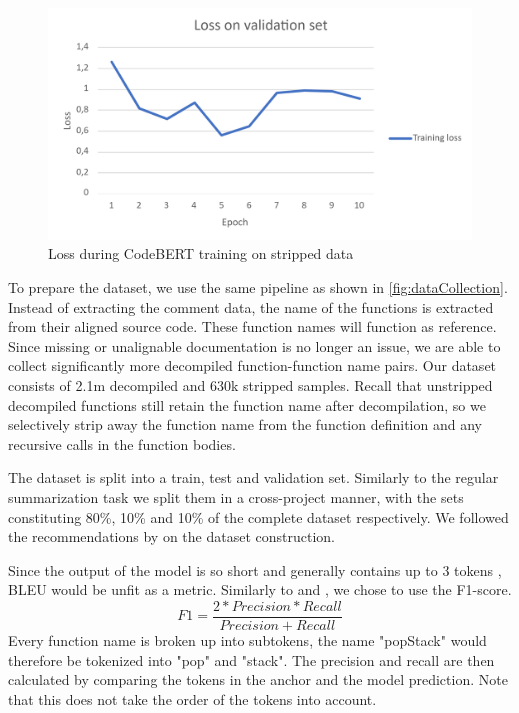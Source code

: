 \label{fig:ExtremeLoss}
\begin{figure}[h]
  \centering
  \includegraphics[width=\linewidth]{img/ExtremeLoss.png}
  \caption{Loss during CodeBERT training on stripped data}
\end{figure}

To prepare the dataset, we use the same pipeline as shown in \ref{fig:dataCollection}. Instead of extracting the comment data, the name of the functions is extracted from their aligned source code. These function names will function as reference. Since missing or unalignable documentation is no longer an issue, we are able to collect significantly more decompiled function-function name pairs. Our dataset consists of 2.1m decompiled and 630k stripped samples. Recall that unstripped decompiled functions still retain the function name after decompilation, so we selectively strip away the function name from the function definition and any recursive calls in the function bodies. 

The dataset is split into a train, test and validation set. Similarly to the regular summarization task we split them in a cross-project manner, with the sets constituting 80\%, 10\% and 10\% of the complete dataset respectively. We followed the recommendations by  \citeauthor{recommend_summarization} on the dataset construction. 

Since the output of the model is so short and generally contains up to 3 tokens \cite{ExtremeSummarization}, BLEU would be unfit as a metric. Similarly to \citeauthor{ExtremeSummarization} and \citeauthor{PolyglotCodeBERT}, we chose to use the F1-score.
\[F1 = \frac{2*Precision*Recall}{Precision+Recall}\] 
Every function name is broken up into subtokens, the name "popStack" would therefore be tokenized into "pop" and "stack". The precision and recall are then calculated by comparing the tokens in the anchor and the model prediction. Note that this does not take the order of the tokens into account.


